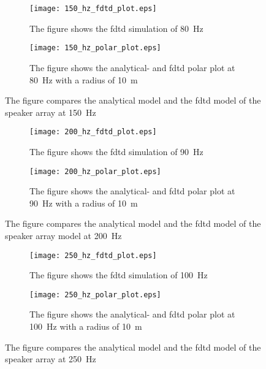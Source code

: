 \begin{figure}[H]
\centering
\begin{subfigure}[htbp]{0.55\textwidth}
		\texttt{[image: 150\_hz\_fdtd\_plot.eps]}
		\caption{The figure shows the \gls{fdtd} simulation of \SI{80}{\hertz}}
		\label{fig:fdtd_150_Hz}
\end{subfigure}
\begin{subfigure}[htbp]{0.35\textwidth}
		\texttt{[image: 150\_hz\_polar\_plot.eps]}
		\caption{The figure shows the analytical- and \gls{fdtd} polar plot at \SI{80}{\hertz} with a radius of \SI{10}{\meter}}
		\label{fig:polar_150_Hz}
\end{subfigure} 
\caption{The figure compares the analytical model and the \gls{fdtd} model of the speaker array at \SI{150}{\hertz}}
\end{figure}


\begin{figure}[H]
\centering
\begin{subfigure}[htbp]{0.55\textwidth}
		\texttt{[image: 200\_hz\_fdtd\_plot.eps]}
		\caption{The figure shows the \gls{fdtd} simulation of \SI{90}{\hertz}}
		\label{fig:fdtd_200_Hz}
\end{subfigure}
\begin{subfigure}[htbp]{0.35\textwidth}
		\texttt{[image: 200\_hz\_polar\_plot.eps]}
		\caption{The figure shows the analytical- and \gls{fdtd} polar plot at \SI{90}{\hertz} with a radius of \SI{10}{\meter}}
		\label{fig:polar_200_Hz}
\end{subfigure} 
\caption{The figure compares the analytical model and the \gls{fdtd} model of the speaker array model at \SI{200}{\hertz}}
\end{figure}


\begin{figure}[H]
\centering
\begin{subfigure}[htbp]{0.55\textwidth}
		\texttt{[image: 250\_hz\_fdtd\_plot.eps]}
		\caption{The figure shows the \gls{fdtd} simulation of \SI{100}{\hertz}}
		\label{fig:fdtd_250_Hz}
\end{subfigure}
\begin{subfigure}[htbp]{0.35\textwidth}
		\texttt{[image: 250\_hz\_polar\_plot.eps]}
		\caption{The figure shows the analytical- and \gls{fdtd} polar plot at \SI{100}{\hertz} with a radius of \SI{10}{\meter}}
		\label{fig:polar_250_Hz}
\end{subfigure} 
\caption{The figure compares the analytical model and the \gls{fdtd} model of the speaker array at \SI{250}{\hertz}}
\end{figure}


